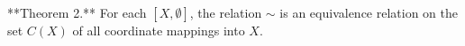 **Theorem 2.** For each $[X, \emptyset]$, the relation $\sim$ is an equivalence relation on the set $C(X)$ of all coordinate mappings into $X$.
